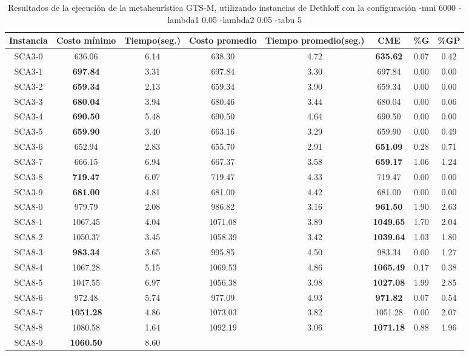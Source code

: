 \begin{table}[h]
\caption{Resultados de la ejecución de la metaheurística GTS-M, utilizando instancias de Dethloff con la configuración -mni 6000 -lambda1 0.05 -lambda2 0.05 -tabu 5}
\centering
\small
\begin{tabular}{c c c c c c c c}
\hline\hline
Instancia & Costo mínimo & Tiempo(seg.) & Costo promedio & Tiempo promedio(seg.) & CME & \%G & \%GP \\ [0.5ex]
\hline
SCA3-0 & 636.06 & 6.14 & 
638.30 & 4.72 & \bf{635.62} & 
0.07 & 0.42\\SCA3-1 & \bf{697.84} & 3.31 & 
697.84 & 3.30 & 697.84 & 0.00
 & 0.00\\
SCA3-2 & \bf{659.34} & 2.13 & 
659.34 & 3.90 & 659.34 & 0.00
 & 0.00\\
SCA3-3 & \bf{680.04} & 3.94 & 
680.46 & 3.44 & 680.04 & 0.00
 & 0.06\\SCA3-4 & \bf{690.50} & 5.48 & 
690.50 & 4.64 & 690.50 & 0.00
 & 0.00\\
SCA3-5 & \bf{659.90} & 3.40 & 
663.16 & 3.29 & 659.90 & 0.00
 & 0.49\\SCA3-6 & 652.94 & 2.83 & 
655.70 & 2.91 & \bf{651.09} & 
0.28 & 0.71\\SCA3-7 & 666.15 & 6.94 & 
667.37 & 3.58 & \bf{659.17} & 
1.06 & 1.24\\SCA3-8 & \bf{719.47} & 6.07 & 
719.47 & 4.33 & 719.47 & 0.00
 & 0.00\\
SCA3-9 & \bf{681.00} & 4.81 & 
681.00 & 4.42 & 681.00 & 0.00
 & 0.00\\
SCA8-0 & 979.79 & 2.08 & 
986.82 & 3.16 & \bf{961.50} & 
1.90 & 2.63\\SCA8-1 & 1067.45 & 4.04 & 
1071.08 & 3.89 & \bf{1049.65} & 
1.70 & 2.04\\SCA8-2 & 1050.37 & 3.45 & 
1058.39 & 3.42 & \bf{1039.64} & 
1.03 & 1.80\\SCA8-3 & \bf{983.34} & 3.65 & 
995.85 & 4.50 & 983.34 & 0.00
 & 1.27\\SCA8-4 & 1067.28 & 5.15 & 
1069.53 & 4.86 & \bf{1065.49} & 
0.17 & 0.38\\SCA8-5 & 1047.55 & 6.97 & 
1056.38 & 3.98 & \bf{1027.08} & 
1.99 & 2.85\\SCA8-6 & 972.48 & 5.74 & 
977.09 & 4.93 & \bf{971.82} & 
0.07 & 0.54\\SCA8-7 & \bf{1051.28} & 4.86 & 
1073.03 & 3.82 & 1051.28 & 0.00
 & 2.07\\SCA8-8 & 1080.58 & 1.64 & 
1092.19 & 3.06 & \bf{1071.18} & 
0.88 & 1.96\\SCA8-9 & \bf{1060.50} & 8.60 & 

\end{tabular}
\end{table}
